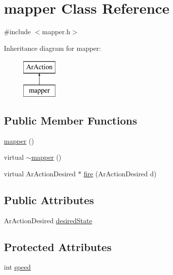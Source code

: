 \hypertarget{classmapper}{}\section{mapper Class Reference}
\label{classmapper}


{\ttfamily \#include $<$mapper.\+h$>$}

Inheritance diagram for mapper\+:\begin{figure}[H]
\begin{center}
\leavevmode
\includegraphics[height=2.000000cm]{classmapper}
\end{center}
\end{figure}
\subsection*{Public Member Functions}
\begin{DoxyCompactItemize}
\item 
\mbox{\hyperlink{classmapper_a63253379db55193ffc58434c32657270}{mapper}} ()
\item 
virtual \mbox{\hyperlink{classmapper_aab426a3eb8681cf2c1137f658a6802a4}{$\sim$mapper}} ()
\item 
virtual Ar\+Action\+Desired $\ast$ \mbox{\hyperlink{classmapper_a9d8bd0abf6844385c45d8b3ccd7b8e87}{fire}} (Ar\+Action\+Desired d)
\end{DoxyCompactItemize}
\subsection*{Public Attributes}
\begin{DoxyCompactItemize}
\item 
Ar\+Action\+Desired \mbox{\hyperlink{classmapper_ad12cf719b7ef6c4399ca718cdc9f270d}{desired\+State}}
\end{DoxyCompactItemize}
\subsection*{Protected Attributes}
\begin{DoxyCompactItemize}
\item 
int \mbox{\hyperlink{classmapper_a2764f9fead6392132485f3545c18b629}{speed}}
\end{DoxyCompactItemize}


